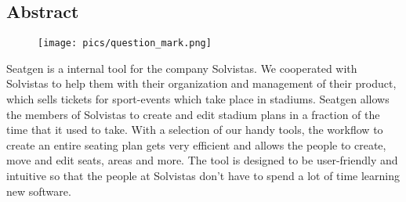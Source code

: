 \begin{spacing}{1}
    \chapter*{Abstract}
\end{spacing}
\begin{wrapfigure}{r}{0.3\textwidth}
    \begin{center}
      \texttt{[image: pics/question\_mark.png]}
    \end{center}
\end{wrapfigure}
Seatgen is a internal tool for the company Solvistas. We cooperated with Solvistas to help them with their organization and management of their product, which sells tickets for sport-events which take place in stadiums. Seatgen allows the members of Solvistas to create and edit stadium plans in a fraction of the time that it used to take. With a selection of our handy tools, the workflow to create an entire seating plan gets very efficient and allows the people to create, move and edit seats, areas and more. The tool is designed to be user-friendly and intuitive so that the people at Solvistas don't have to spend a lot of time learning new software.
\newpage
